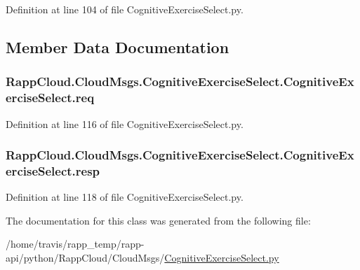 Definition at line 104 of file Cognitive\-Exercise\-Select.\-py.



\subsection{Member Data Documentation}
\hypertarget{classRappCloud_1_1CloudMsgs_1_1CognitiveExerciseSelect_1_1CognitiveExerciseSelect_a30b314928e78a7ae2a7eefdecfd71742}{
\subsubsection[{req}]{\setlength{\rightskip}{0pt plus 5cm}Rapp\-Cloud.\-Cloud\-Msgs.\-Cognitive\-Exercise\-Select.\-Cognitive\-Exercise\-Select.\-req}}\label{classRappCloud_1_1CloudMsgs_1_1CognitiveExerciseSelect_1_1CognitiveExerciseSelect_a30b314928e78a7ae2a7eefdecfd71742}


Definition at line 116 of file Cognitive\-Exercise\-Select.\-py.

\hypertarget{classRappCloud_1_1CloudMsgs_1_1CognitiveExerciseSelect_1_1CognitiveExerciseSelect_a5e581a0ab360d2371bca9dabf456bd0d}{
\subsubsection[{resp}]{\setlength{\rightskip}{0pt plus 5cm}Rapp\-Cloud.\-Cloud\-Msgs.\-Cognitive\-Exercise\-Select.\-Cognitive\-Exercise\-Select.\-resp}}\label{classRappCloud_1_1CloudMsgs_1_1CognitiveExerciseSelect_1_1CognitiveExerciseSelect_a5e581a0ab360d2371bca9dabf456bd0d}


Definition at line 118 of file Cognitive\-Exercise\-Select.\-py.



The documentation for this class was generated from the following file\-:\begin{DoxyCompactItemize}
\item 
/home/travis/rapp\-\_\-temp/rapp-\/api/python/\-Rapp\-Cloud/\-Cloud\-Msgs/\hyperlink{CognitiveExerciseSelect_8py}{Cognitive\-Exercise\-Select.\-py}\end{DoxyCompactItemize}
